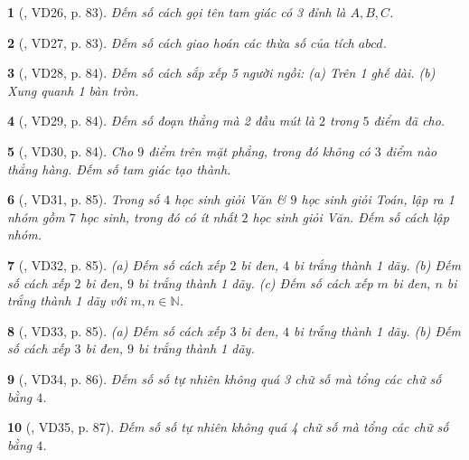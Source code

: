 \documentclass{article}
\newtheorem{baitoan}{}
\begin{document}
\begin{baitoan}[\cite{Binh_Toan_6_tap_2}, VD26, p. 83]
	Đếm số cách gọi tên tam giác có 3 đỉnh là $A,B,C$.
\end{baitoan}

\begin{baitoan}[\cite{Binh_Toan_6_tap_2}, VD27, p. 83]
	Đếm số cách giao hoán các thừa số của tích $abcd$.
\end{baitoan}

\begin{baitoan}[\cite{Binh_Toan_6_tap_2}, VD28, p. 84]
	Đếm số cách sắp xếp 5 người ngồi: (a) Trên 1 ghế dài. (b) Xung quanh 1 bàn tròn.
\end{baitoan}

\begin{baitoan}[\cite{Binh_Toan_6_tap_2}, VD29, p. 84]
	Đếm số đoạn thẳng mà 2 đầu mút là $2$ trong $5$ điểm đã cho.
\end{baitoan}

\begin{baitoan}[\cite{Binh_Toan_6_tap_2}, VD30, p. 84]
	Cho $9$ điểm trên mặt phẳng, trong đó không có $3$ điểm nào thẳng hàng. Đếm số tam giác tạo thành.
\end{baitoan}

\begin{baitoan}[\cite{Binh_Toan_6_tap_2}, VD31, p. 85]
	Trong số $4$ học sinh giỏi Văn \& $9$ học sinh giỏi Toán, lập ra 1 nhóm gồm $7$ học sinh, trong đó có ít nhất $2$ học sinh giỏi Văn. Đếm số cách lập nhóm.
\end{baitoan}

\begin{baitoan}[\cite{Binh_Toan_6_tap_2}, VD32, p. 85]
	(a) Đếm số cách xếp $2$ bi đen, $4$ bi trắng thành 1 dãy. (b) Đếm số cách xếp $2$ bi đen, $9$ bi trắng thành 1 dãy. (c) Đếm số cách xếp $m$ bi đen, $n$ bi trắng thành 1 dãy với $m,n\in\mathbb{N}$.
\end{baitoan}

\begin{baitoan}[\cite{Binh_Toan_6_tap_2}, VD33, p. 85]
	(a) Đếm số cách xếp $3$ bi đen, $4$ bi trắng thành 1 dãy. (b) Đếm số cách xếp $3$ bi đen, $9$ bi trắng thành 1 dãy. 
\end{baitoan}

\begin{baitoan}[\cite{Binh_Toan_6_tap_2}, VD34, p. 86]
	Đếm số số tự nhiên không quá 3 chữ số mà tổng các chữ số bằng $4$.
\end{baitoan}

\begin{baitoan}[\cite{Binh_Toan_6_tap_2}, VD35, p. 87]
	Đếm số số tự nhiên không quá 4 chữ số mà tổng các chữ số bằng $4$.
\end{baitoan}
\end{document}
